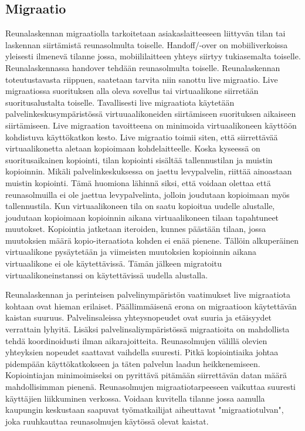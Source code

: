 \documentclass[finnish]{tktltiki2}
\theoremstyle{definition}
\theoremstyle{remark}
\begin{document}
\subsection{Migraatio}
Reunalaskennan migraatiolla tarkoitetaan asiakaslaitteeseen liittyvän tilan tai laskennan siirtämistä reunasolmulta toiselle.
Handoff/-over on mobiiliverkoissa yleisesti ilmenevä tilanne jossa, mobiililaitteen yhteys siirtyy tukiasemalta toiselle.
Reunalaskennassa handover tehdään reunasolmulta toiselle. Reunalaskennan
toteutustavasta riippuen, saatetaan tarvita niin sanottu live migraatio. Live migraatiossa suorituksen alla oleva sovellus tai virtuaalikone siirretään suoritusalustalta toiselle.
Tavallisesti live migraatiota käytetään palvelinkeskusympäristössä virtuuaalikoneiden siirtämiseen suorituksen aikaiseen siirtämiseen. Live migraation tavoitteena on minimoida virtuaalikoneen käyttöön kohdistuva käyttökatkon kesto.
Live migraatio toimii siten, että siirrettävää virtuaalikonetta aletaan kopioimaan kohdelaitteelle.
Koska kyseessä on suoritusaikainen kopiointi, tilan kopiointi sisältää tallennustilan ja muistin kopioinnin.
Mikäli palvelinkeskuksessa on jaettu levypalvelin, riittää ainoastaan muistin kopiointi. Tämä huomiona lähinnä siksi, että voidaan olettaa että reunasolmuilla ei ole jaettua levypalvelinta, jolloin joudutaan kopioimaan myös tallennustila. 
Kun virtuaalikoneen tila on saatu kopioitua uudelle alustalle, joudutaan kopioimaan kopioinnin aikana virtuaalikoneen tilaan tapahtuneet muutokset.
Kopiointia jatketaan iteroiden, kunnes päästään tilaan, jossa muutoksien määrä kopio-iteraatiota kohden ei enää pienene.
Tällöin alkuperäinen virtuaalikone pysäytetään ja viimeisten muutoksien kopioinnin aikana virtuaalikone ei ole käytettävissä. Tämän jälkeen migratoitu virtuaalikoneinstanssi on käytettävissä uudella alustalla. \cite{ha2015adaptive}

Reunalaskennan ja perinteisen palvelinympäristön vaatimukset live migraatiota kohtaan ovat hieman erilaiset.
Päällimmäisenä erona on migraatioon käytettävän kaistan suuruus. Palvelinsaleissa yhteysnopeudet ovat suuria ja etäisyydet verrattain lyhyitä. Lisäksi palvelinsaliympäristössä migraatioita on mahdollista tehdä koordinoidusti ilman aikarajoitteita.
Reunasolmujen välillä olevien yhteyksien nopeudet saattavat vaihdella suuresti.
Pitkä kopiointiaika johtaa pidempään käyttökatkokseen ja täten palvelun laadun heikkenemiseen. Kopiointiajan minimoimiseksi on pyrittävä pitämään siirrettävän datan määrä mahdollisimman pienenä. Reunasolmujen migraatiotarpeeseen vaikuttaa suuresti käyttäjien liikkuminen verkossa. Voidaan kuvitella tilanne jossa aamulla kaupungin keskustaan saapuvat työmatkailijat aiheuttavat "migraatiotulvan", joka ruuhkauttaa reunasolmujen käytössä olevat kaistat.  
\end{document}
